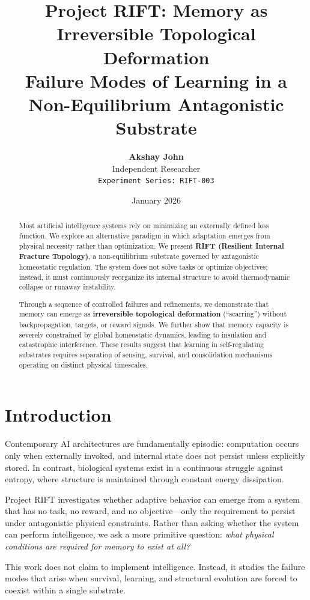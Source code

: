 \documentclass[11pt, a4paper]{article}
\title{\textbf{Project RIFT: Memory as Irreversible Topological Deformation}\\
\large Failure Modes of Learning in a Non-Equilibrium Antagonistic Substrate}
\author{\textbf{Akshay John} \\ Independent Researcher \\ \texttt{Experiment Series: RIFT-003}}
\date{January 2026}
\begin{document}
\maketitle

\begin{abstract}
Most artificial intelligence systems rely on minimizing an externally defined loss function. We explore an alternative paradigm in which adaptation emerges from physical necessity rather than optimization. We present \textbf{RIFT (Resilient Internal Fracture Topology)}, a non-equilibrium substrate governed by antagonistic homeostatic regulation. The system does not solve tasks or optimize objectives; instead, it must continuously reorganize its internal structure to avoid thermodynamic collapse or runaway instability.

Through a sequence of controlled failures and refinements, we demonstrate that memory can emerge as \textbf{irreversible topological deformation} (“scarring”) without backpropagation, targets, or reward signals. We further show that memory capacity is severely constrained by global homeostatic dynamics, leading to insulation and catastrophic interference. These results suggest that learning in self-regulating substrates requires separation of sensing, survival, and consolidation mechanisms operating on distinct physical timescales.
\end{abstract}

\section{Introduction}

Contemporary AI architectures are fundamentally episodic: computation occurs only when externally invoked, and internal state does not persist unless explicitly stored. In contrast, biological systems exist in a continuous struggle against entropy, where structure is maintained through constant energy dissipation.

Project RIFT investigates whether adaptive behavior can emerge from a system that has no task, no reward, and no objective—only the requirement to persist under antagonistic physical constraints. Rather than asking whether the system can perform intelligence, we ask a more primitive question: \textit{what physical conditions are required for memory to exist at all?}

This work does not claim to implement intelligence. Instead, it studies the failure modes that arise when survival, learning, and structural evolution are forced to coexist within a single substrate.
\end{document}
